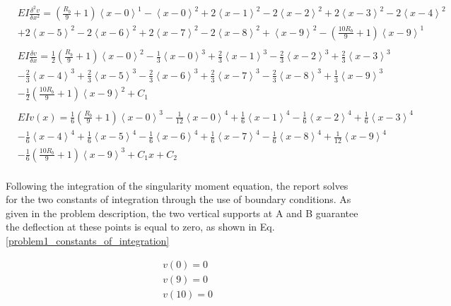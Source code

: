 \documentclass[a4paper]{article}
\begin{document}
\begin{equation}
    \begin{split}
& EI \frac{\delta^2 v}{\delta x^2} = \left(\frac{R_b}{9} + 1\right)\left<x-0\right>^1 - \left<x-0\right>^2 +  2\left<x-1\right>^2 - 2\left<x-2\right>^2 +  2\left<x-3\right>^2 - 2\left<x-4\right>^2  \\
& +  2\left<x-5\right>^2 - 2\left<x-6\right>^2  +  2\left<x-7\right>^2 - 2\left<x-8\right>^2 + \left <x-9\right>^2 - \left( \frac{10R_b}{9} + 1\right)\left<x-9\right>^1 \\
& \\
& EI \frac{\delta v}{\delta x} =  \frac{1}{2}\left(\frac{R_b}{9} + 1\right)\left<x-0\right>^2 - \frac{1}{3}\left<x-0\right>^3 +  \frac{2}{3}\left<x-1\right>^3 - \frac{2}{3}\left<x-2\right>^3 +  \frac{2}{3}\left<x-3\right>^3  \\
& - \frac{2}{3}\left<x-4\right>^3  +  \frac{2}{3}\left<x-5\right>^3 - \frac{2}{3}\left<x-6\right>^3  +  \frac{2}{3}\left<x-7\right>^3 - \frac{2}{3}\left<x-8\right>^3 +  \frac{1}{3}\left<x-9\right>^3 \\
& - \frac{1}{2}\left( \frac{10R_b}{9} + 1\right)\left<x-9\right>^2  + C_1\\
& \\
& EI v(x) = \frac{1}{6}\left(\frac{R_b}{9} + 1\right)\left<x-0\right>^3 - \frac{1}{12}\left<x-0\right>^4 +  \frac{1}{6}\left<x-1\right>^4 - \frac{1}{6}\left<x-2\right>^4 + \frac{1}{6}\left<x-3\right>^4   \\      
& - \frac{1}{6}\left<x-4\right>^4 +  \frac{1}{6}\left<x-5\right>^4 - \frac{1}{6}\left<x-6\right>^4  +  \frac{1}{6}\left<x-7\right>^4 - \frac{1}{6}\left<x-8\right>^4 +  \frac{1}{12}\left<x-9\right>^4  \\
& - \frac{1}{6}\left( \frac{10R_b}{9} + 1\right)\left<x-9\right>^3 + C_1x + C_2 \\
    \end{split}
\label{problem1_equations}
\end{equation}

Following the integration of the singularity moment equation, the report solves for the two constants of integration through the use of boundary conditions. As given in the problem description, the two vertical supports at A and B guarantee the deflection at these points is equal to zero, as shown in Eq. \ref{problem1_constants_of_integration}

\begin{equation}
\begin{split}
	& v(0) = 0 \\
	& v(9) = 0 \\
	& v(10) = 0 \\
\end{split}
\label{problem1_constants_of_integration}
\end{equation}
\end{document}
